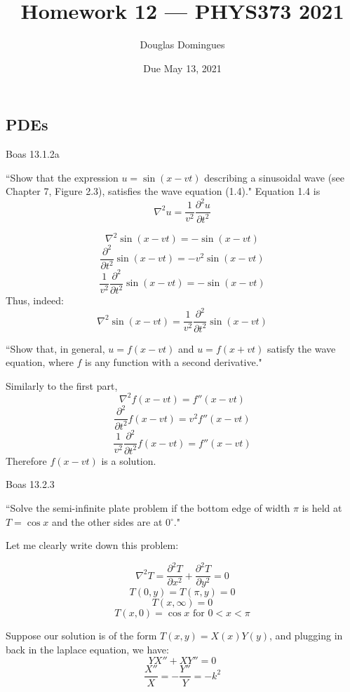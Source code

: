 \documentclass[answers]{exam}\newcommand{\repositoryInformationSetup}{     \usepackage[dvipsnames]{xcolor}     \usepackage[ angle=90, color=black, opacity=1, scale=2, ]{background}      \SetBgPosition{current page.west}      \SetBgVshift{-4.5mm}      \backgroundsetup{contents={{\color{green}\texttt{-{}-} differs from commit \texttt{f3526e2} in 0 files}}} } \newcommand{\commit}{{{\color{green}f3526e2}}}\usepackage{amsmath}
\newcommand{\grad}{\ensuremath{\nabla}\xspace}
\newcommand{\laplacian}{\ensuremath{\grad^2}\xspace}
\begin{document}
\title{Homework 12 --- PHYS373 2021}

\author{Douglas Domingues}

\date{Due May 13, 2021}

\maketitle

\begin{questions}

	\section*{PDEs}
	\question Boas 13.1.2a

	\begin{solution}
		``Show that the expression $u = \sin (x - vt)$ describing a sinusoidal wave (see Chapter 7, Figure 2.3), satisfies the wave equation (1.4)."
		Equation 1.4 is $$\laplacian u = \frac{1}{v^2} \frac{\partial^2u}{\partial t^2}$$

		$$ \laplacian \sin(x-vt) = -\sin(x-vt)$$
		$$ \frac{\partial^2}{\partial t^2} \sin(x-vt) = -v^2\sin(x-vt)$$
		$$ \frac{1}{v^2} \frac{\partial^2}{\partial t^2} \sin(x-vt) = -\sin(x-vt)$$
		Thus, indeed:
		$$ \laplacian \sin(x-vt) = \frac{1}{v^2} \frac{\partial^2}{\partial t^2} \sin(x-vt) $$

		``Show that, in general, $u = f (x - vt)$ and $u = f (x + vt)$ satisfy the wave equation, where $f$ is any
		function with a second derivative."

		Similarly to the first part,
		$$ \laplacian f(x-vt) = f''(x-vt)$$
		$$ \frac{\partial^2}{\partial t^2} f(x-vt) = v^2 f''(x-vt)$$
		$$ \frac{1}{v^2} \frac{\partial^2}{\partial t^2} f(x-vt) =  f''(x-vt)$$
		Therefore $f(x-vt)$ is a solution.

	\end{solution}
	\question Boas 13.2.3

	\begin{solution}
		``Solve the semi-infinite plate problem if the bottom edge of width $\pi$ is held at
		$T = \cos x$ and the other sides are at 0$^{\circ}$."

		Let me clearly write down this problem:

		$$ \laplacian T = \frac{\partial^2 T}{\partial x^2} + \frac{\partial^2 T}{\partial y^2} = 0$$
		$$ T(0,y) = T(\pi,y) = 0 $$
		$$ T(x,\infty) = 0$$
		$$ T(x,0) = \cos x \text{ for } 0<x<\pi$$

		Suppose our solution is of the form $T(x,y) = X(x)Y(y)$, and plugging in back in the laplace equation, we have:
		$$ Y X'' + X Y'' = 0$$
		$$ \frac{X''}{X} = - \frac{Y''}{Y} = -k^2 $$


\end{solution}
\end{questions}
\end{document}
